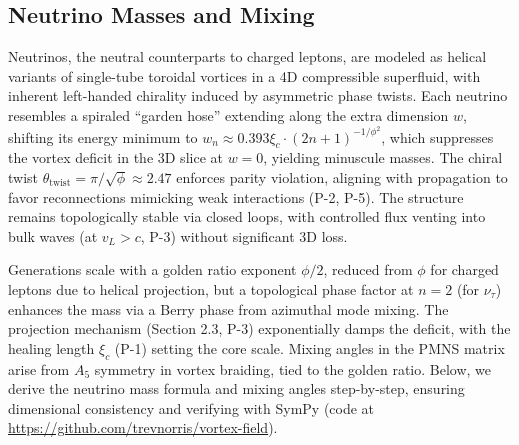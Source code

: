 \subsection{Neutrino Masses and Mixing}

Neutrinos, the neutral counterparts to charged leptons, are modeled as helical variants of single-tube toroidal vortices in a 4D compressible superfluid, with inherent left-handed chirality induced by asymmetric phase twists. Each neutrino resembles a spiraled ``garden hose'' extending along the extra dimension $w$, shifting its energy minimum to $w_n \approx 0.393 \xi_c \cdot (2n+1)^{-1/\phi^2}$, which suppresses the vortex deficit in the 3D slice at $w=0$, yielding minuscule masses. The chiral twist $\theta_{\text{twist}} = \pi / \sqrt{\phi} \approx 2.47$ enforces parity violation, aligning with propagation to favor reconnections mimicking weak interactions (P-2, P-5). The structure remains topologically stable via closed loops, with controlled flux venting into bulk waves (at $v_L > c$, P-3) without significant 3D loss.

Generations scale with a golden ratio exponent $\phi/2$, reduced from $\phi$ for charged leptons due to helical projection, but a topological phase factor at $n=2$ (for $\nu_\tau$) enhances the mass via a Berry phase from azimuthal mode mixing. The projection mechanism (Section 2.3, P-3) exponentially damps the deficit, with the healing length $\xi_c$ (P-1) setting the core scale. Mixing angles in the PMNS matrix arise from $A_5$ symmetry in vortex braiding, tied to the golden ratio. Below, we derive the neutrino mass formula and mixing angles step-by-step, ensuring dimensional consistency and verifying with SymPy (code at \url{https://github.com/trevnorris/vortex-field}).

